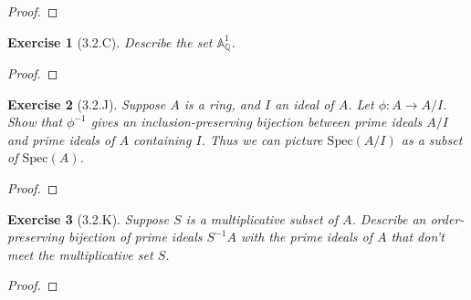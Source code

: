 \documentclass{amsart}
\newtheorem*{exercise*}{Exercise}
\newcommand{\Q}{\mathbb{Q}}
\begin{document}
\vspace{0.1in}

\begin{proof}
	
\end{proof}

\vspace{0.1in}


\begin{exercise*}[3.2.C]
    Describe the set $\mathbb{A}^1_\Q$.
\end{exercise*}

\vspace{0.1in}

\begin{proof}
	
\end{proof}

\vspace{0.1in}


\begin{exercise*}[3.2.J]
    Suppose $A$ is a ring, and $I$ an ideal of $A$. Let $\phi:A\rightarrow A/I$. Show that $\phi^{-1}$ gives an inclusion-preserving bijection between prime ideals $A/I$ and prime ideals of $A$ containing $I$. Thus we can picture $\mathrm{Spec}(A/I)$ as a subset of $\mathrm{Spec}(A)$. 
\end{exercise*}

\vspace{0.1in}

\begin{proof}
	
\end{proof}

\vspace{0.1in}


\begin{exercise*}[3.2.K]
    Suppose $S$ is a multiplicative subset of $A$. Describe an order-preserving bijection of prime ideals $S^{-1}A$ with the prime ideals of $A$ that don't meet the multiplicative set $S$. 
\end{exercise*}

\vspace{0.1in}

\begin{proof}
	
\end{proof}
\end{document}
